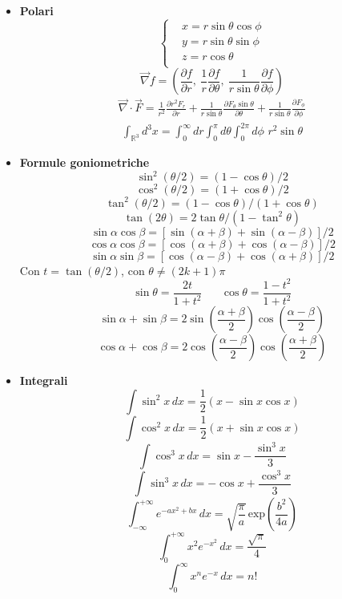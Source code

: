 \documentclass{article}
\begin{document}
\begin{footnotesize}
\begin{multicols*}{3}
\begin{itemize}[leftmargin=*]
	\item \textbf{Polari}
		\[
			\left\{\begin{aligned}
				&x= r\sin\theta \cos\phi\\ 
				&y= r\sin\theta \sin\phi \\
				&z= r\cos\theta \\
			\end{aligned}\right.
		\]
		\[\vec{\nabla} f = \left(\frac{\partial f}{\partial r},\ \frac{1}{r}\frac{\partial f}{\partial \theta },\ \frac{1}{r\sin\theta}\frac{\partial f}{\partial \phi }\right)\]
		\begin{align*}\vec{\nabla} \cdot \vec{F} = \frac{1}{r^2}\frac{\partial r^2F_r}{\partial r} + \frac{1}{r\sin\theta }\frac{\partial F_\theta \sin\theta }{\partial \theta } + \frac{1}{r\sin\theta }\frac{\partial F_\phi }{\partial \phi }\end{align*}
		\begin{align*}\int_{\mathbb{R}^3}d^3x = \int_{0}^{\infty }dr \int_{0}^{\pi }d\theta  \int_{0}^{2\pi }d\phi \,\, r^2 \sin\theta \end{align*}

	\item \textbf{Formule goniometriche}
		\[\sin^2(\theta /2) = (1-\cos\theta )/2\]
		\[\cos^2(\theta /2) = (1+\cos\theta )/2\]
		\[\tan^2(\theta /2) = (1-\cos\theta )/(1+\cos\theta )\]
		\[\tan(2\theta ) = 2\tan\theta /(1-\tan^2\theta )\]
		\[\sin\alpha \cos\beta = [\sin(\alpha +\beta )+\sin(\alpha -\beta )]/2\]
		\[\cos\alpha \cos\beta = [\cos(\alpha +\beta )+\cos(\alpha -\beta )]/2\]
		\[\sin\alpha \sin\beta = [\cos(\alpha -\beta )+\cos(\alpha +\beta )]/2\]
		Con $t=\tan(\theta  /2)$, con $\theta \neq (2k+1)\pi $
		\[\sin\theta = \frac{2t}{1+t^2} \hspace{20pt}\cos\theta = \frac{1-t^2}{1+t^2}\]
		\[\sin\alpha +\sin\beta  = 2\sin\left(\frac{\alpha +\beta }{2}\right)\cos\left(\frac{\alpha -\beta }{2}\right)\]
		\[\cos\alpha +\cos\beta  = 2\cos\left(\frac{\alpha -\beta }{2}\right)\cos\left(\frac{\alpha +\beta }{2}\right)\]

	\item \textbf{Integrali}
		\[\int \sin^2 x \,dx = \frac{1}{2}(x-\sin x\cos x) \]
		\[\int \cos^2 x \,dx = \frac{1}{2}(x+\sin x\cos x) \]
		\[\int \cos^3 x \,dx = \sin x - \frac{\sin^3 x}{3}\]
		\[\int \sin^3 x \,dx =-\cos x + \frac{\cos^3 x}{3}\]
		\[\int_{-\infty }^{+\infty } e^{-ax^2+bx}\,dx = \sqrt{\frac{\pi }{a}}\, \mathrm{exp}\left(\frac{b^2}{4a}\right)\]
		\[\int_{0}^{+\infty }x^2e^{-x^2}\,dx = \frac{\sqrt{\pi }}{4}\]
		\[\int_{0}^{\infty } x^n e^{-x} \,dx = n! \]


\end{itemize}
\end{multicols*}
\end{footnotesize}
\end{document}

